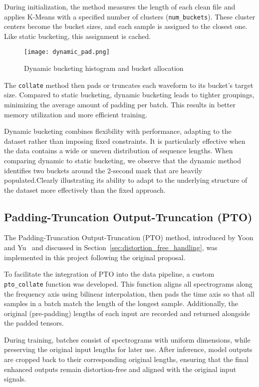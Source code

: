 During initialization, the method measures the length of each clean file and applies K-Means with a specified number of clusters (\texttt{num\_buckets}). These cluster centers become the bucket sizes, and each sample is assigned to the closest one. Like static bucketing, this assignment is cached.

\begin{figure}[H]
    \centering
    \texttt{[image: dynamic\_pad.png]}
    \caption{Dynamic bucketing histogram and bucket allocation}
    \label{fig:dynamic_pad}
\end{figure}

The \texttt{collate} method then pads or truncates each waveform to its bucket's target size. Compared to static bucketing, dynamic bucketing leads to tighter groupings, minimizing the average amount of padding per batch. This results in better memory utilization and more efficient training.

Dynamic bucketing combines flexibility with performance, adapting to the dataset rather than imposing fixed constraints. It is particularly effective when the data contains a wide or uneven distribution of sequence lengths. When comparing dynamic to static bucketing, we observe that the dynamic method identifies two buckets around the 2-second mark that are heavily populated.Clearly illustrating its ability to adapt to the underlying structure of the dataset more effectively than the fixed approach.


\subsection{Padding-Truncation Output-Truncation (PTO)}
\label{subsec:pto_dataset}

The Padding-Truncation Output-Truncation (PTO) method, introduced by Yoon and Yu~\cite{yoon2020pto} and discussed in Section~\ref{sec:distortion_free_handling}, was implemented in this project following the original proposal.

To facilitate the integration of PTO into the data pipeline, a custom \texttt{pto\_collate} function was developed. This function aligns all spectrograms along the frequency axis using bilinear interpolation, then pads the time axis so that all samples in a batch match the length of the longest sample. Additionally, the original (pre-padding) lengths of each input are recorded and returned alongside the padded tensors.

During training, batches consist of spectrograms with uniform dimensions, while preserving the original input lengths for later use. After inference, model outputs are cropped back to their corresponding original lengths, ensuring that the final enhanced outputs remain distortion-free and aligned with the original input signals.

